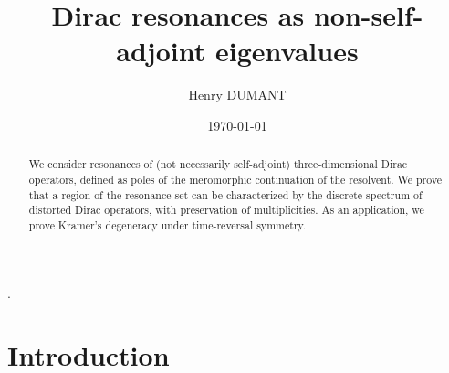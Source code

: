 \documentclass[a4paper, 12pt]{amsart}
\title{Dirac resonances as non-self-adjoint eigenvalues}
\date{\today}
\author{Henry DUMANT}
\numberwithin{equation}{section}
\begin{document}
\usetikzlibrary{patterns}.


\begin{abstract} 
    We consider resonances of (not necessarily self-adjoint) three-dimensional Dirac operators, defined as poles of the meromorphic continuation of the resolvent. We prove that a region of the resonance set can be characterized by the discrete spectrum of distorted Dirac operators, with preservation of multiplicities. As an application, we prove Kramer's degeneracy under time-reversal symmetry.
\end{abstract}

\maketitle

\section{Introduction}\label{Introduction}
\end{document}
